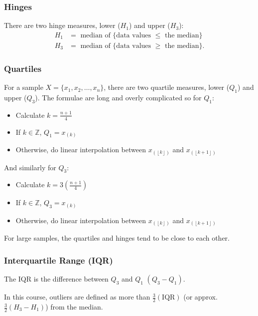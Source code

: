 \documentclass[a4paper, 12pt, twoside]{article}
\def\lf{\left\lfloor}
\def\rf{\right\rfloor}
\begin{document}
\subsubsection{Hinges}

There are two hinge measures, lower ($H_1$) and upper ($H_3$):
\begin{align*}
    H_1 & = \text{ median of \{data values } \leq \text{ the median\}}  \\
    H_3 & = \text{ median of \{data values } \geq \text{ the median\}}.
\end{align*}

\subsubsection{Quartiles}

For a sample $X = \{x_1, x_2, \ldots, x_n\}$, there are two quartile
measures, lower ($Q_1$) and upper ($Q_3$). The formulae are long and
overly complicated so for $Q_1$:

\begin{itemize}
    \item Calculate $k = \frac{n + 1}{4}$
    \item If $k \in \mathbb{Z}$, $Q_1 = x_{(k)}$
    \item Otherwise, do linear interpolation between $x_{(\lf k\rf)}$
          and $x_{(\lf k+1\rf)}$
\end{itemize}

And similarly for $Q_3$:

\begin{itemize}
    \item Calculate $k = 3\left(\frac{n + 1}{4}\right)$
    \item If $k \in \mathbb{Z}$, $Q_3 = x_{(k)}$
    \item Otherwise, do linear interpolation between $x_{(\lf k\rf)}$
          and $x_{(\lf k+1\rf)}$
\end{itemize}

For large samples, the quartiles and hinges tend to be close to each
other.

\subsubsection{Interquartile Range (IQR)}

The IQR is the difference between $Q_3$ and $Q_1$ $(Q_3 - Q_1)$.

In this course, outliers are defined as more than
$\frac{3}{2}(\text{IQR})$ (or approx. $\frac{3}{2}(H_3 - H_1)$) from the median.
\end{document}
